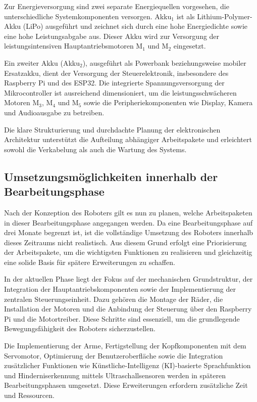 Zur Energieversorgung sind zwei separate Energiequellen vorgesehen, die unterschiedliche Systemkomponenten versorgen. Akku$_1$ ist als Lithium-Polymer-Akku (LiPo) ausgeführt und zeichnet sich durch eine hohe Energiedichte sowie eine hohe Leistungsabgabe aus. Dieser Akku wird zur Versorgung der leistungsintensiven Hauptantriebsmotoren M$_1$ und M$_2$ eingesetzt. 

Ein zweiter Akku (Akku$_2$), ausgeführt als Powerbank beziehungsweise mobiler Ersatzakku, dient der Versorgung der Steuerelektronik, insbesondere des Raspberry Pi und des ESP32. Die integrierte Spannungsversorgung der Mikrocontroller ist ausreichend dimensioniert, um die leistungsschwächeren Motoren M$_3$, M$_4$ und M$_5$ sowie die Peripheriekomponenten wie Display, Kamera und Audioausgabe zu betreiben.

Die klare Strukturierung und durchdachte Planung der elektronischen Architektur unterstützt die Aufteilung abhängiger Arbeitspakete und erleichtert sowohl die Verkabelung als auch die Wartung des Systems. 

\subsection{Umsetzungsmöglichkeiten innerhalb der Bearbeitungsphase}
\label{cha:Umsetzungsmöglichkeiten innerhalb der Praxisphase}

Nach der Konzeption des Roboters gilt es nun zu planen, welche Arbeitspaketen in dieser Bearbeitungsphase angegangen werden. Da eine Bearbeitungsphase auf drei Monate begrenzt ist, ist die vollständige Umsetzung des Roboters innerhalb dieses Zeitraums nicht realistisch. Aus diesem Grund erfolgt eine Priorisierung der Arbeitspakete, um die wichtigsten Funktionen zu realisieren und gleichzeitig eine solide Basis für spätere Erweiterungen zu schaffen.

In der aktuellen Phase liegt der Fokus auf der mechanischen Grundstruktur, der Integration der Hauptantriebskomponenten sowie der Implementierung der zentralen Steuerungseinheit. Dazu gehören die Montage der Räder, die Installation der Motoren und die Anbindung der Steuerung über den Raspberry Pi und die Motortreiber. Diese Schritte sind essenziell, um die grundlegende Bewegungsfähigkeit des Roboters sicherzustellen.

Die Implementierung der Arme, Fertigstellung der Kopfkomponenten mit dem Servomotor, Optimierung der Benutzeroberfläche sowie die Integration zusätzlicher Funktionen wie Künstliche-Intelligenz (KI)-basierte Sprachfunktion und Hinderniserkennung mittels Ultraschallsensoren werden in späteren Bearbeitungsphasen umgesetzt. Diese Erweiterungen erfordern zusätzliche Zeit und Ressourcen.

